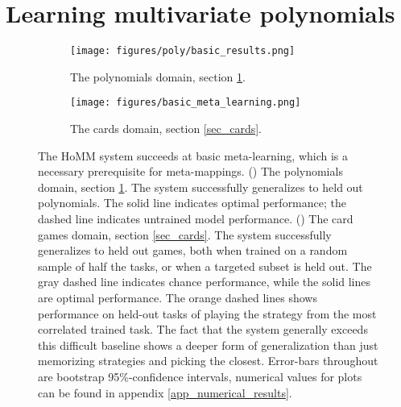 \documentclass{article}
\begin{document}
\section{Learning multivariate polynomials} \label{sec_poly}
\begin{figure}[t]
\centering
\begin{subfigure}[t]{0.5\textwidth}
\texttt{[image: figures/poly/basic\_results.png]}
\caption{The polynomials domain, section \ref{sec_poly}.}
\label{poly_basic_results}
\end{subfigure}%
\begin{subfigure}[t]{0.5\textwidth}
\texttt{[image: figures/basic\_meta\_learning.png]}
\caption{The cards domain, section \ref{sec_cards}.}
\label{cards_basic_results}
\end{subfigure}%
\caption{The HoMM system succeeds at basic meta-learning, which is a necessary prerequisite for meta-mappings. () The polynomials domain, section \ref{sec_poly}. The system successfully generalizes to held out polynomials. The solid line indicates optimal performance; the dashed line indicates untrained model performance. () The card games domain, section \ref{sec_cards}. The system successfully generalizes to held out games, both when trained on a random sample of half the tasks, or when a targeted subset is held out. The gray dashed line indicates chance performance, while the solid lines are optimal performance. The orange dashed lines shows performance on held-out tasks of playing the strategy from the most correlated trained task. The fact that the system generally exceeds this difficult baseline shows a deeper form of generalization than just memorizing strategies and picking the closest. Error-bars throughout are bootstrap 95\%-confidence intervals, numerical values for plots can be found in appendix \ref{app_numerical_results}.}
\end{figure}
\end{document}
